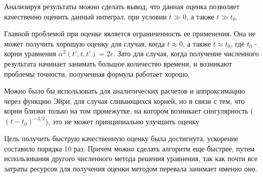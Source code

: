 \documentclass[%
bachelor,    %
natbib,      %
subf,        %
href,        %
colorlinks,  %
]{disser}
\begin{document}
Анализируя результаты можно сделать вывод, что данная оценка позволяет качественно оценить данный интеграл, при условии $t \gg 0$, а также $t \gg t_0$.

Главной проблемой при оценке является ограниченность ее применения. Она не может получить хорошую оценку для случая, когда $t \approx 0$, а также $t \approx t_0$, где $t_0$ - корни уравнения $\alpha^2(t', t, t') = 2\epsilon$. Зато для случая, когда получение численного результата начинает занимать большое количество времени, и возникают проблемы точности, полученная формула работает хорошо. 

Можно было бы использовать для аналитических расчетов и аппроксимацию через функцию Эйри, для случая сливающихся корней, но в связи с тем, что корни близки только на том промежутке, на котором возникает сингулярность ($(t-t_0)^{-3/2}$), это не может принципиально улучшить оценку

Цель получить быструю качественную оценку была достигнута, ускорение составило порядка 10 раз. Причем можно сделать алгоритм еще быстрее, путем использования другого численного метода решения уравнения, так как почти все затраты ресурсов для получения оценки методом перевала занимает именно оно.

 
\newpage
%
\end{document}
